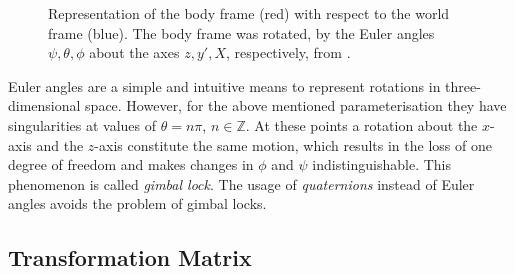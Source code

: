 \begin{figure}
\centering
{}
\caption{Representation of the body frame (red) with respect to the world frame (blue). The body frame was rotated, by the Euler angles $\psi, \theta, \phi$ about the axes $z, y', X$, respectively, from \cite{Wiki_taitbryan}.} \label{fig:Euler_angles}
\end{figure}

Euler angles are a simple and intuitive means to represent rotations in three-dimensional space. However, for the above mentioned parameterisation they have singularities at values of $\theta = n \pi$, $n \in \mathbb{Z}$. At these points a rotation about the $x$-axis and the $z$-axis constitute the same motion, which results in the loss of one degree of freedom and makes changes in $\phi$ and $\psi$ indistinguishable. This phenomenon is called \emph{gimbal lock}. The usage of \emph{quaternions} instead of Euler angles avoids the problem of gimbal locks.

\subsection{Transformation Matrix}

